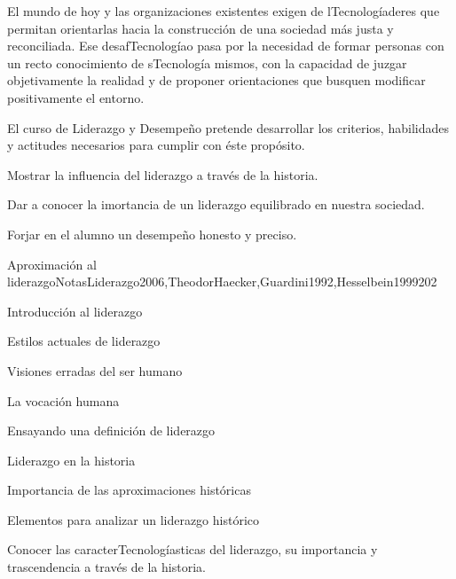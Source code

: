 \begin{syllabus}


\begin{justification}
El mundo de hoy y las organizaciones existentes exigen de lTecnologíaderes que permitan orientarlas hacia la construcción de una sociedad más justa y reconciliada.  Ese desafTecnologíao pasa por la necesidad de formar personas con un recto conocimiento de sTecnología mismos, con la capacidad de juzgar objetivamente la realidad y de proponer orientaciones que busquen modificar positivamente el entorno.

El curso de Liderazgo y Desempeño pretende desarrollar los criterios, habilidades y actitudes necesarios para cumplir con éste propósito.
\end{justification}

\begin{goals}
\item \OutcomeHU
\item Mostrar la influencia del liderazgo a través de la historia.
\item Dar a conocer la imortancia de un liderazgo equilibrado en nuestra sociedad.
\item Forjar en el alumno un desempeño honesto y preciso.
\end{goals}

\begin{outcomes}
\end{outcomes}

\begin{unit}{Aproximación al liderazgo}{NotasLiderazgo2006,TheodorHaecker,Guardini1992,Hesselbein1999}{20}{2}
\begin{topics}
	\item Introducción al liderazgo
	\item Estilos actuales de liderazgo
	\item Visiones erradas del ser humano
	\item La vocación humana
	\item Ensayando una definición de liderazgo
	\item Liderazgo en la historia
	\item Importancia de las aproximaciones históricas
	\item Elementos para analizar un liderazgo histórico
\end{topics}
\begin{unitgoals}
	\item Conocer las caracterTecnologíasticas del liderazgo, su importancia y trascendencia a través de la historia.
\end{unitgoals}
\end{unit}


\end{syllabus}
